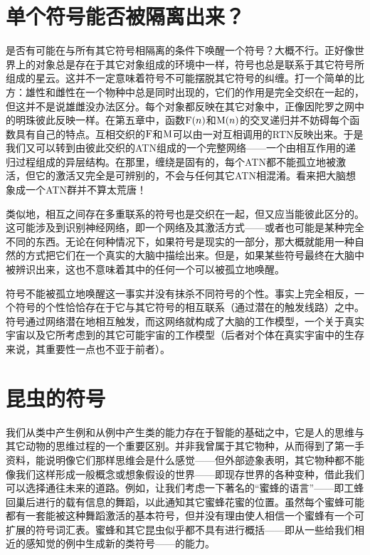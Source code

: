 \section{单个符号能否被隔离出来？}

是否有可能在与所有其它符号相隔离的条件下唤醒一个符号？大概不行。正好像世界上的对象总是存在于其它对象组成的环境中一样，符号也总是联系于其它符号所组成的星云。这并不一定意味着符号不可能摆脱其它符号的纠缠。打一个简单的比方：雄性和雌性在一个物种中总是同时出现的，它们的作用是完全交织在一起的，但这并不是说雄雌没办法区分。每个对象都反映在其它对象中，正像因陀罗之网中的明珠彼此反映一样。在第五章中，函数$\operatorname{F}(n)$和$\operatorname{M}(n)$的交叉递归并不妨碍每个函数具有自己的特点。互相交织的$\operatorname{F}$和$\operatorname{M}$可以由一对互相调用的RTN反映出来。于是我们又可以转到由彼此交织的ATN组成的一个完整网络——一个由相互作用的递归过程组成的异层结构。在那里，缠绕是固有的，每个ATN都不能孤立地被激活，但它的激活又完全是可辨别的，不会与任何其它ATN相混淆。看来把大脑想象成一个ATN群并不算太荒唐！

类似地，相互之间存在多重联系的符号也是交织在一起，但又应当能彼此区分的。这可能涉及到识别神经网络，即一个网络及其激活方式——或者也可能是某种完全不同的东西。无论在何种情况下，如果符号是现实的一部分，那大概就能用一种自然的方式把它们在一个真实的大脑中描绘出来。但是，如果某些符号最终在大脑中被辨识出来，这也不意味着其中的任何一个可以被孤立地唤醒。

符号不能被孤立地唤醒这一事实并没有抹杀不同符号的个性。事实上完全相反，一个符号的个性恰恰存在于它与其它符号的相互联系（通过潜在的触发线路）之中。符号通过网络潜在地相互触发，而这网络就构成了大脑的工作模型，一个关于真实宇宙以及它所考虑到的其它可能宇宙的工作模型（后者对个体在真实宇宙中的生存来说，其重要性一点也不亚于前者）。

\section{昆虫的符号}

我们从类中产生例和从例中产生类的能力存在于智能的基础之中，它是人的思维与其它动物的思维过程的一个重要区别。并非我曾属于其它物种，从而得到了第一手资料，能说明像它们那样思维会是什么感觉——但外部迹象表明，其它物种都不能像我们这样形成一般概念或想象假设的世界——即现存世界的各种变种，借此我们可以选择通往未来的道路。例如，让我们考虑一下著名的“蜜蜂的语言”——即工蜂回巢后进行的载有信息的舞蹈，以此通知其它蜜蜂花蜜的位置。虽然每个蜜蜂可能都有一套能被这种舞蹈激活的基本符号，但并没有理由使人相信一个蜜蜂有一个可扩展的符号词汇表。蜜蜂和其它昆虫似乎都不具有进行概括——即从一些给我们相近的感知觉的例中生成新的类符号——的能力。

